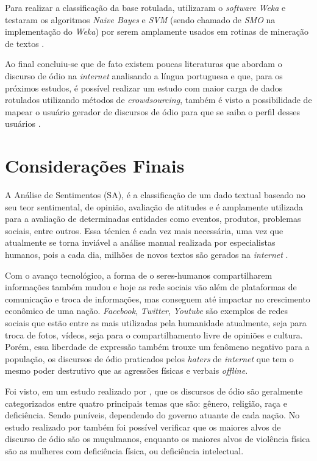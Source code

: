 Para realizar a classificação da base rotulada,  utilizaram o \textit{software} \textit{Weka} e testaram os algoritmos \textit{Naive Bayes} e \textit{SVM} (sendo chamado de \textit{SMO} na implementação do \textit{Weka}) por serem amplamente usados em rotinas de mineração de textos \cite{Pelle2017}. 

Ao final concluiu-se que de fato existem poucas literaturas que abordam o discurso de ódio na \textit{internet} analisando a língua portuguesa e que, para os próximos estudos, é possível realizar um estudo com maior carga de dados rotulados utilizando métodos de \textit{crowdsourcing}, também é visto a possibilidade de mapear o usuário gerador de discursos de ódio para que se saiba o perfil desses usuários \cite{Pelle2017}.

\section{Considerações Finais}
A Análise de Sentimentos (SA), é a classificação de um dado textual baseado no seu teor sentimental, de opinião, avaliação de atitudes e é amplamente utilizada para a avaliação de determinadas entidades como eventos, produtos, problemas sociais, entre outros. Essa técnica é cada vez mais necessária, uma vez que atualmente se torna inviável a análise manual realizada por especialistas humanos, pois a cada dia, milhões de novos textos são gerados na \textit{internet} \cite{BAHRI2018669}.

Com o avanço tecnológico, a forma de o seres-humanos compartilharem informações também mudou e hoje as rede sociais vão além de plataformas de comunicação e troca de informações, mas conseguem até impactar no crescimento econômico de uma nação. \textit{Facebook}, \textit{Twitter}, \textit{Youtube} são exemplos de redes sociais que estão entre as mais utilizadas pela humanidade atualmente, seja para troca de fotos, vídeos, seja para o compartilhamento livre de opiniões e cultura. Porém, essa liberdade de expressão também trouxe um fenômeno negativo para a população, os discursos de ódio praticados pelos \textit{haters} de \textit{internet} que tem o mesmo poder destrutivo que as agressões físicas e verbais \textit{offline}. 

Foi visto, em um estudo realizado por , que os discursos de ódio são geralmente categorizados entre quatro principais temas que são: gênero, religião, raça e deficiência. Sendo puníveis, dependendo do governo atuante de cada nação. No estudo realizado por  também foi possível verificar que os maiores alvos de discurso de ódio são os muçulmanos, enquanto os maiores alvos de violência física são as mulheres com deficiência física, ou deficiência intelectual.


